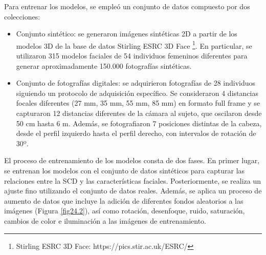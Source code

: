 Para entrenar los modelos, se empleó un conjunto de datos compuesto por dos colecciones: 

\begin{itemize}
	\item Conjunto sintético: se generaron imágenes sintéticas 2D a partir de los modelos 3D de la base de datos Stirling ESRC 3D Face \footnote{Stirling ESRC 3D Face: https://pics.stir.ac.uk/ESRC/}. En particular, se utilizaron 315 modelos faciales de 54 individuos femeninos diferentes para generar aproximadamente 150.000 fotografías sintéticas.
	\item Conjunto de fotografías digitales: se adquirieron fotografías de 28 individuos siguiendo un protocolo de adquisición específico. Se consideraron 4 distancias focales diferentes (27 mm, 35 mm, 55 mm, 85 mm) en formato full frame y se capturaron 12 distancias diferentes de la cámara al sujeto, que oscilaron desde 50 cm hasta 6 m. Además, se fotografiaron 7 posiciones distintas de la cabeza, desde el perfil izquierdo hasta el perfil derecho, con intervalos de rotación de 30º. 
\end{itemize}


El proceso de entrenamiento de los modelos consta de dos fases. En primer lugar, se entrenan los modelos con el conjunto de datos sintéticos para capturar las relaciones entre la SCD y las características faciales. Posteriormente, se realiza un ajuste fino utilizando el conjunto de datos reales. Además, se aplica un proceso de aumento de datos que incluye la adición de diferentes fondos aleatorios a las imágenes (Figura \ref{fig24.2}), así como rotación, desenfoque, ruido, saturación, cambios de color e iluminación a las imágenes de entrenamiento.

